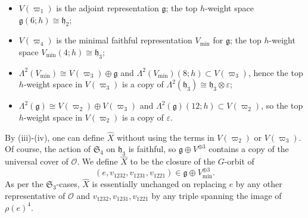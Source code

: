 \documentclass{amsart}
\theoremstyle{definition}
\def\mini{\mathrm{min}}
\newcommand{\g}{\mathfrak{g}}
\newcommand{\0}{\mathcal{O}}
\begin{document}
\begin{itemize}
\item[i)] $V(\varpi_1)$ is the adjoint representation ${\mathfrak g}$; the top $h$-weight space ${\mathfrak g}(6;h)\cong {\mathfrak h}_2$;

\item[ii)] $V(\varpi_4)$ is the minimal faithful representation $V_{\mini}$ for ${\mathfrak g}$; the top $h$-weight space $V_{\mini}(4;h)\cong{\mathfrak h}_3$;

\item[iii)] $\Lambda^2(V_{\mini})\cong V(\varpi_3)\oplus \g$ and $\Lambda^2(V_{\mini})(8;h)\subset V(\varpi_3)$, hence the top $h$-weight space in $V(\varpi_3)$ is a copy of $\Lambda^2({\mathfrak h}_3)\cong {\mathfrak h}_3\otimes\varepsilon$;

\item[iv)] $\Lambda^2(\g)\cong V(\varpi_2)\oplus V(\varpi_3)$ and $\Lambda^2(\g)(12;h)\subset V(\varpi_2)$, so the top $h$-weight space in $V(\varpi_2)$ is a copy of $\varepsilon$.
\end{itemize}

By (iii)-(iv), one can define $\hat{X}$ without using the terms in $V(\varpi_2)$ or $V(\varpi_3)$.
Of course, the action of $\mathfrak{S}_4$ on ${\mathfrak h}_3$ is faithful, so $\g\oplus V^{\oplus 3}$ contains a copy of the universal cover of $\0$.
We define $\hat{X}$ to be the closure of the $G$-orbit of 
$$(e,v_{1232}, v_{1231}, v_{1221})\in {\mathfrak g}\oplus  V_\mini^{\oplus 3}.$$
As per the $\mathfrak{S}_3$-cases, $\hat{X}$ is essentially unchanged on replacing $e$ by any other representative of $\0$ and $v_{1232},v_{1231},v_{1221}$ by any triple spanning the image of $\rho(e)^4$.
\end{document}
